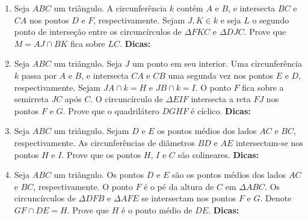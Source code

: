 \documentclass{article}
\newcommand{\dica}{\textbf{Dicas:}}
\newcommand{\iniTri}{Seja $ABC$ um triângulo}
\begin{document}
\begin{multicols}{2}
\begin{enumerate}
    \item \iniTri. A circunferência $k$ contém $A$ e $B$, e intersecta $BC$ e $CA$ nos pontos $D$ e $F$, respectivamente. Sejam $J, K \in k$ e seja $L$ o segundo ponto de interseção entre os circuncírculos de $\Delta FKC$ e $\Delta DJC$. Prove que $M=AJ\cap BK$ fica sobre $LC$. \dica %
    
    \item \iniTri. Seja $J$ um ponto em seu interior. Uma circunferência $k$ passa por $A$ e $B$, e intersecta $CA$ e $CB$ uma segunda vez nos pontos $E$ e $D$, respectivamente. Sejam $JA\cap k=H$ e $JB\cap k=I$. O ponto $F$ fica sobre a semirreta $JC$ após $C$. O circuncírculo de $\Delta EIF$ intersecta a reta $FJ$ nos pontos $F$ e $G$. Prove que o quadrilátero $DGHF$ é cíclico. \dica %
    
    \item \iniTri. Sejam $D$ e $E$ os pontos médios dos lados $AC$ e $BC$, respectivamente. As circunferências de diâmetros $BD$ e $AE$ intersectam-se nos pontos $H$ e $I$. Prove que os pontos $H$, $I$ e $C$ são colineares. \dica %
    
    \item \iniTri. Os pontos $D$ e $E$ são os pontos médios dos lados $AC$ e $BC$, respectivamente. O ponto $F$ é o pé da altura de $C$ em $\Delta ABC$. Os circuncírculos de $\Delta DFB$ e $\Delta AFE$ se intersectam nos pontos $F$ e $G$. Denote $GF\cap DE=H$. Prove que $H$ é o ponto médio de $DE$. \dica %
    
    
    
    
    
    
    
    
    
\end{enumerate}
\end{multicols}
\end{document}
